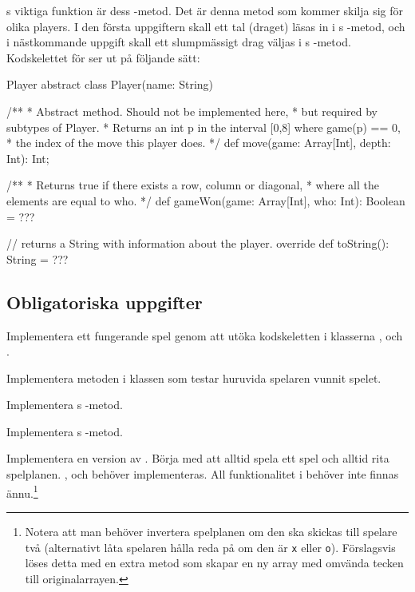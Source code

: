 s viktiga funktion är dess -metod. Det är denna metod som kommer skilja sig för olika players. I den första uppgiftern skall ett tal (draget) läsas in i s -metod, och i nästkommande uppgift skall ett slumpmässigt drag väljas i s -metod.
Kodskelettet för  ser ut på följande sätt:
\begin{ScalaSpec}{Player}
abstract class Player(name: String) {

	/**
	 * Abstract method. Should not be implemented here,
	 * but required by subtypes of Player.
	 * Returns an int p in the interval [0,8] where game(p) == 0,
	 * the index of the move this player does.
	 */
	def move(game: Array[Int], depth: Int): Int;

	/**
	 * Returns true if there exists a row, column or diagonal,
	 * where all the elements are equal to who.
	 */
	def gameWon(game: Array[Int], who: Int): Boolean = ???

	// returns a String with information about the player.
	override def toString(): String = ???
}
\end{ScalaSpec}


\subsection{Obligatoriska uppgifter}

\Task Implementera ett fungerande spel genom att utöka kodskeletten i klasserna ,  och .

\Subtask Implementera metoden  i klassen  som testar huruvida spelaren  vunnit spelet.

\Subtask Implementera s -metod.

\Subtask Implementera s -metod.

\Subtask Implementera en version av . Börja med att alltid spela ett spel och alltid rita spelplanen. ,  och  behöver implementeras. All funktionalitet i  behöver inte finnas ännu.\footnote{Notera att man behöver invertera spelplanen om den ska skickas till spelare två (alternativt låta spelaren hålla reda på om den är \texttt{x} eller \texttt{o}). Förslagsvis löses detta med en extra metod  som skapar en ny array med omvända tecken till originalarrayen.}

\Task {}

